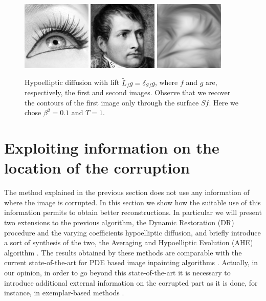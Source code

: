 \documentclass[proc]{edpsmath}
\begin{document}
\begin{figure}
  \includegraphics[height=3.3cm]{imgs/eye}\qquad
  \includegraphics[height=3.3cm]{imgs/napo-orig}\qquad
  \includegraphics[height=3.3cm]{imgs/napoleon-eye}
  \caption{Hypoelliptic diffusion with lift $\tilde{ L}_f g = \delta_{Sf}g$, where $f$ and $g$ are, respectively, the first and second images. Observe that we recover the contours of the first image only through the surface $Sf$. Here we chose $\beta^2 = 0.1$ and $T=1$.}
  \label{fig:PH-no-val}
\end{figure}


\section{Exploiting information on the location of the corruption}\label{s-corr}

The method explained in the previous section does not use any information of where the image is corrupted. In this section we show how the suitable use of this information permits to obtain better reconstructions. In particular we will present two extensions to the previous algorithm, the Dynamic Restoration (DR) procedure \cite{Remizov2013} and the varying coefficients hypoelliptic diffusion, and briefly introduce a sort of synthesis of the two, the Averaging and Hypoelliptic Evolution (AHE) algorithm \cite{ahe}. The results obtained by these methods are comparable with the current state-of-the-art for PDE based image inpainting algorithms \cite{Facciolo,cao}.
  Actually, in our opinion, in order to go beyond this state-of-the-art it is necessary to introduce additional external information on the corrupted part as it is done, for instance, in exemplar-based methods \cite{cao}.
\end{document}
